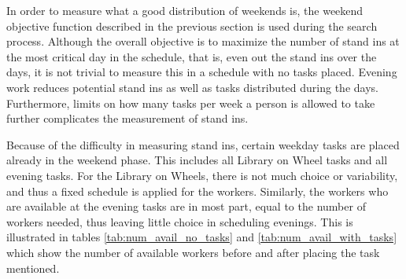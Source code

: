 In order to measure what a good distribution of weekends is, the weekend objective function described in the previous section is used during the search process. Although the overall objective is to maximize the number of stand ins at the most critical day in the schedule, that is, even out the stand ins over the days, it is not trivial to measure this in a schedule with no tasks placed. Evening work reduces potential stand ins as well as tasks distributed during the days. Furthermore, limits on how many tasks per week a person is allowed to take further complicates the measurement of stand ins.

Because of the difficulty in measuring stand ins, certain weekday tasks are placed already in the weekend phase. This includes all Library on Wheel tasks and all evening tasks. For the Library on Wheels, there is not much choice or variability, and thus a fixed schedule is applied for the workers. Similarly, the workers who are available at the evening tasks are in most part, equal to the number of workers needed, thus leaving little choice in scheduling evenings. This is illustrated in tables \ref{tab:num_avail_no_tasks} and \ref{tab:num_avail_with_tasks} which show the number of available workers before and after placing the task mentioned.

